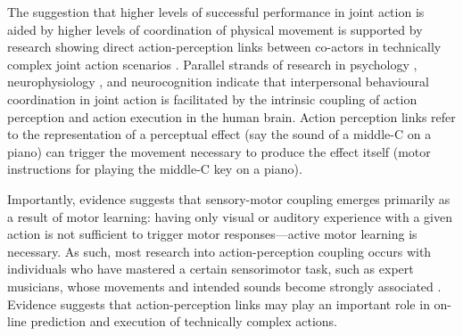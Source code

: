 \begin{CJK}{UTF8}{gbsn}
The suggestion that higher levels of successful performance in joint action is aided by higher levels of coordination of physical movement is supported by research showing direct action-perception links between co-actors in technically complex joint action scenarios \citep{Novembre2014}.  Parallel strands of research in psychology \citep{Prinz1990,Prinz1997,Prinz2013}, neurophysiology \citep{Rizzolatti2004,Rizzolatti2010}, and neurocognition \citep{Wolpert1998,Wolpert2000} indicate that interpersonal behavioural coordination in joint action is facilitated by the intrinsic coupling of action perception and action execution in the human brain.  Action perception links refer to the representation of a perceptual effect (say the sound of a middle-C on a piano) can trigger the movement necessary to produce the effect itself (motor instructions for playing the middle-C key on a piano).

Importantly, evidence suggests that sensory-motor coupling emerges primarily as a result of motor learning: having only visual \citep{Candidi2014} or auditory \citep{Lahav2007} experience with a given action is not sufficient to trigger motor responses---active motor learning is necessary.  As such, most research into action-perception coupling occurs with individuals who have mastered a certain sensorimotor task, such as expert musicians, whose movements and intended sounds become strongly associated \citep{Novembre2014}.  Evidence suggests that action-perception links may play an important role in on-line prediction \citep{Maidhof2009,Ruiz2009} and execution \citep{Drost2005a,Keller2010} of technically complex actions.


\end{CJK}

